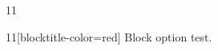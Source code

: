 \documentclass[paper=A4]{ropas-poster}
\begin{document}
\begin{postergrid}{1}{1}
\begin{posterblock}{1}{1}[blocktitle-color=red]
Block option test.
\end{posterblock}
\end{postergrid}
\end{document}
